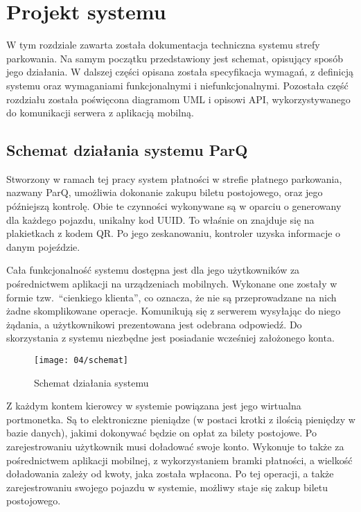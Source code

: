 \setcounter{listing}{0}

\section{Projekt systemu}
W tym rozdziale zawarta została dokumentacja techniczna systemu strefy parkowania. Na samym początku przedstawiony jest schemat, opisujący sposób jego działania. W dalszej części opisana została specyfikacja wymagań, z definicją systemu oraz wymaganiami funkcjonalnymi i niefunkcjonalnymi. Pozostała część rozdziału została poświęcona diagramom UML i opisowi API, wykorzystywanego do komunikacji serwera z aplikacją mobilną. 

\subsection{Schemat działania systemu ParQ}

Stworzony w ramach tej pracy system płatności w strefie płatnego parkowania, nazwany ParQ, umożliwia dokonanie zakupu biletu postojowego, oraz jego późniejszą kontrolę. Obie te czynności wykonywane są w oparciu o generowany dla każdego pojazdu, unikalny kod UUID. To właśnie on znajduje się na plakietkach z kodem QR. Po jego zeskanowaniu, kontroler uzyska informacje o danym pojeździe.

Cała funkcjonalność systemu dostępna jest dla jego użytkowników za pośrednictwem aplikacji na urządzeniach mobilnych. Wykonane one zostały w formie tzw.~``cienkiego klienta'', co oznacza, że nie są przeprowadzane na nich żadne skomplikowane operacje. Komunikują się z serwerem wysyłając do niego żądania, a użytkownikowi prezentowana jest odebrana odpowiedź. Do skorzystania z systemu niezbędne jest posiadanie wcześniej założonego konta.

\begin{figure}[h]
	\begin{center}
		\texttt{[image: 04/schemat]}
	\end{center}
	\caption{Schemat działania systemu}
\end{figure}

Z każdym kontem kierowcy w systemie powiązana jest jego wirtualna portmonetka. Są to elektroniczne pieniądze (w postaci krotki z ilością pieniędzy w bazie danych), jakimi dokonywać będzie on opłat za bilety postojowe. Po zarejestrowaniu użytkownik musi doładować swoje konto. Wykonuje to także za pośrednictwem aplikacji mobilnej, z wykorzystaniem bramki płatności, a wielkość doładowania zależy od kwoty, jaka została wpłacona. Po tej operacji, a także zarejestrowaniu swojego pojazdu w systemie, możliwy staje się zakup biletu postojowego.

